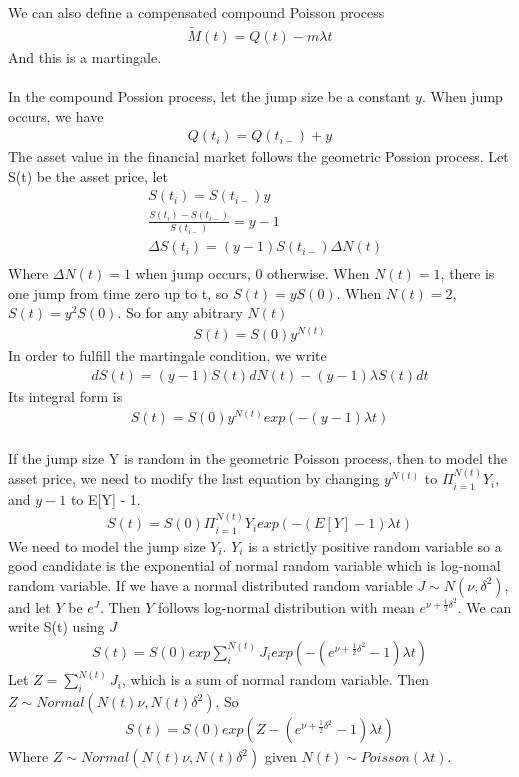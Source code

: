 \documentclass[a4paper]{article}
\begin{document}
We can also define a compensated compound Poisson process
\begin{align*}
	\tilde M(t) = Q(t) - m \lambda t
\end{align*}
And this is a martingale.\\

\\
In the compound Possion process, let the jump size be a constant $y$. When jump occurs, we have 
\begin{align*}
	Q(t_i) = Q(t_{i-}) + y 
\end{align*}
The asset value in the financial market follows the geometric Possion process. Let S(t) be the asset price, let
\begin{align*}
	& S(t_i) = S(t_{i-}) y \\
	& \frac{S(t_i) - S(t_{i-})}{S(t_{i-})} =  y - 1 \\
	&  \Delta S(t_i) =  (y - 1) S(t_{i-}) \Delta N(t)  \\
\end{align*}
Where $\Delta N(t) = 1$ when jump occurs, $0$ otherwise. When $N(t) = 1$, there is one jump from time zero up to t, so $S(t) = yS(0)$. When $N(t) = 2$, $S(t) = y^2 S(0)$. So for any abitrary $N(t)$
\begin{align*}
	S(t) = S(0)y^{N(t)} 
\end{align*}
In order to fulfill the martingale condition, we write
\begin{align*}
	dS(t) = (y - 1)S(t) dN(t) - (y - 1) \lambda S(t) dt
\end{align*}
Its integral form is
\begin{align*}
	S(t) = S(0)y^{N(t)} exp(- (y - 1) \lambda t) 
\end{align*}
\\
If the jump size Y is random in the geometric Poisson process, then to model the asset price, we need to modify
the last equation by changing $y^{N(t)}$ to $\Pi_{i=1}^{N(t)} Y_i$, and $y - 1$ to E[Y] - 1. 
\begin{align*}
	S(t) = S(0)\Pi_{i=1}^{N(t)} Y_i exp(- (E[Y] - 1) \lambda t) 
\end{align*}
We need to model the jump size $Y_i$. $Y_i$ is a strictly positive random variable so a good candidate is the exponential of normal random variable which is log-nomal random variable. If we have a normal distributed random variable $J \sim N(\nu, \delta^2)$, and let $Y$ be $e^{J}$. Then $Y$ follows log-normal distribution with mean $e^{\nu + \frac{1}{2}\delta^2}$. We can write S(t) using $J$
\begin{align*}
	S(t) = S(0) exp{\sum_i^{N(t)} J_i} exp(-(e^{\nu + \frac{1}{2}\delta^2}-1) \lambda t) 
\end{align*}
Let $Z = \sum_i^{N(t)} J_i$, which is a sum of normal random variable. Then $Z \sim Normal(N(t)\nu, N(t)\delta^2)$. So
\begin{align*}
	S(t) = S(0) exp{(Z -(e^{\nu + \frac{1}{2}\delta^2}-1) \lambda t)} 
\end{align*}
Where $ Z \sim Normal(N(t)\nu, N(t)\delta^2)$ given $N(t) \sim Poisson(\lambda t)$.\\
\end{document}
